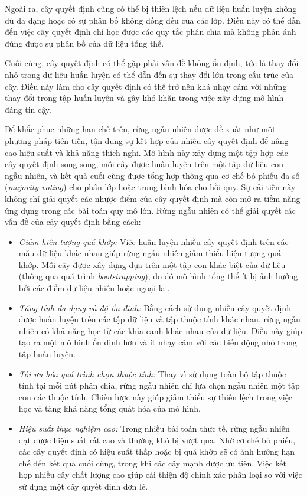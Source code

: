 Ngoài ra, cây quyết định cũng có thể bị thiên lệch nếu dữ liệu huấn luyện không đủ đa dạng hoặc có sự phân bố không đồng đều của các lớp. Điều này có thể dẫn đến việc cây quyết định chỉ học được các quy tắc phân chia mà không phản ánh đúng được sự phân bố của dữ liệu tổng thể.

Cuối cùng, cây quyết định có thể gặp phải vấn đề không ổn định, tức là thay đổi nhỏ trong dữ liệu huấn luyện có thể dẫn đến sự thay đổi lớn trong cấu trúc của cây. Điều này làm cho cây quyết định có thể trở nên khá nhạy cảm với những thay đổi trong tập huấn luyện và gây khó khăn trong việc xây dựng mô hình đáng tin cậy.

Để khắc phục những hạn chế trên, rừng ngẫu nhiên được đề xuất như một phương pháp tiên tiến, tận dụng sự kết hợp của nhiều cây quyết định để nâng cao hiệu suất và khả năng thích nghi. Mô hình này xây dựng một tập hợp các cây quyết định song song, mỗi cây được huấn luyện trên một tập dữ liệu con ngẫu nhiên, và kết quả cuối cùng được tổng hợp thông qua cơ chế bỏ phiếu đa số (\textit{majority voting}) cho phân lớp hoặc trung bình hóa cho hồi quy. Sự cải tiến này không chỉ giải quyết các nhược điểm của cây quyết định mà còn mở ra tiềm năng ứng dụng trong các bài toán quy mô lớn. Rừng ngẫu nhiên có thể giải quyết các vấn đề của cây quyết định bằng cách:
\begin{itemize}
    \item \textit{Giảm hiện tượng quá khớp:} Việc huấn luyện nhiều cây quyết định trên các mẫu dữ liệu khác nhau giúp rừng ngẫu nhiên giảm thiểu hiện tượng quá khớp. Mỗi cây được xây dựng dựa trên một tập con khác biệt của dữ liệu (thông qua quá trình \textit{bootstrapping}), do đó mô hình tổng thể ít bị ảnh hưởng bởi các điểm dữ liệu nhiễu hoặc ngoại lai.
    \item \textit{Tăng tính đa dạng và độ ổn định:} Bằng cách sử dụng nhiều cây quyết định được huấn luyện trên các tập dữ liệu và tập thuộc tính khác nhau, rừng ngẫu nhiên có khả năng học từ các khía cạnh khác nhau của dữ liệu. Điều này giúp tạo ra một mô hình ổn định hơn và ít nhạy cảm với các biến động nhỏ trong tập huấn luyện.
    \item \textit{Tối ưu hóa quá trình chọn thuộc tính:} Thay vì sử dụng toàn bộ tập thuộc tính tại mỗi nút phân chia, rừng ngẫu nhiên chỉ lựa chọn ngẫu nhiên một tập con các thuộc tính. Chiến lược này giúp giảm thiểu sự thiên lệch trong việc học và tăng khả năng tổng quát hóa của mô hình.
    \item \textit{Hiệu suất thực nghiệm cao:} Trong nhiều bài toán thực tế, rừng ngẫu nhiên đạt được hiệu suất rất cao và thường khó bị vượt qua. Nhờ cơ chế bỏ phiếu, các cây quyết định có hiệu suất thấp hoặc bị quá khớp sẽ có ảnh hưởng hạn chế đến kết quả cuối cùng, trong khi các cây mạnh được ưu tiên. Việc kết hợp nhiều cây chất lượng cao giúp cải thiện độ chính xác phân loại so với việc sử dụng một cây quyết định đơn lẻ.
\end{itemize}

